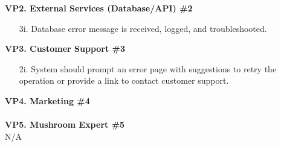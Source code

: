 \documentclass{article}
\begin{document}
\begin{enumerate}[{\bf BE1.}]
{\begin{enumerate}
\begin{enumerate}
	        \end{enumerate}
	    \end{enumerate}
	    }
	    \textbf{VP2. External Services (Database/API) \#2}
	    {
	        \begin{enumerate}
	        \item[3i.] Database error message is received, logged, and troubleshooted.
	    \end{enumerate}
	    }
	    \textbf{VP3. Customer Support \#3}
	        {
	        \begin{enumerate}
	        \item[2i.] System should prompt an error page with suggestions to retry the operation or provide a link to contact customer support.\\
	    \end{enumerate}
	    }
	    \textbf{VP4. Marketing \#4}\\
	    \hspace{1in}{N/A}\\[1mm]
	    
	    \textbf{VP5. Mushroom Expert \#5}\\
		\hspace{1.5cm}     N/A \\
	    

\end{enumerate}
\end{document}
